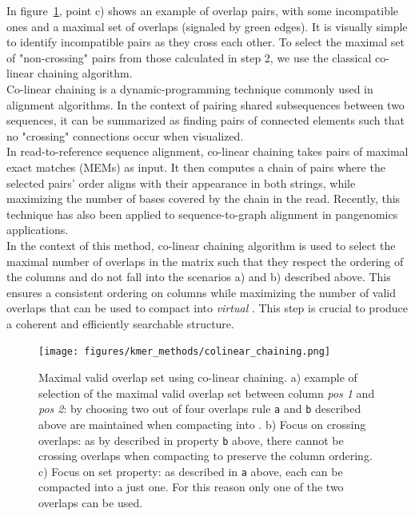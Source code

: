 In figure~\ref{fig:skmer_colinear}, point c) shows an example of overlap pairs, with some incompatible ones and a maximal set of overlaps (signaled by green edges). It is visually simple to identify incompatible pairs as they cross each other. To select the maximal set of "non-crossing" pairs from those calculated in step 2, we use the classical co-linear chaining algorithm.\\
Co-linear chaining is a dynamic-programming technique commonly used in alignment algorithms. In the context of pairing shared subsequences between two sequences, it can be summarized as finding pairs of connected elements such that no "crossing" connections occur when visualized. \\
In read-to-reference sequence alignment, co-linear chaining takes pairs of maximal exact matches (MEMs) as input. It then computes a chain of pairs where the selected pairs' order aligns with their appearance in both strings, while maximizing the number of bases covered by the chain in the read. Recently, this technique has also been applied to sequence-to-graph alignment in pangenomics applications.\\
In the context of this method, co-linear chaining algorithm is used to select the maximal number of \kmer overlaps in the matrix such that they respect the ordering of the columns and do not fall into the scenarios a) and b) described above. This ensures a consistent ordering on columns while maximizing the number of valid overlaps that can be used to compact \kmers into \emph{virtual} \skmers. This step is crucial to produce a coherent and efficiently searchable structure.

\begin{figure}[H]
	\centering
	\texttt{[image: figures/kmer\_methods/colinear\_chaining.png]}
	\caption[Maximal valid overlap set using co-linear chaining.]{Maximal valid overlap set using co-linear chaining. a) example of selection of the maximal valid overlap set between column \emph{pos 1} and \emph{pos 2}: by choosing two out of four overlaps rule \texttt{a} and \texttt{b} described above are maintained when compacting \kmers into \skmers. b) Focus on crossing overlaps: as by described in property \texttt{b} above, there cannot be crossing overlaps when compacting \kmers to preserve the column ordering. c) Focus on \kmer set property: as described in \texttt{a} above, each \kmer can be compacted into a \skmer just one. For this reason only one of the two overlaps can be used. }
	\label{fig:skmer_colinear}
\end{figure}

